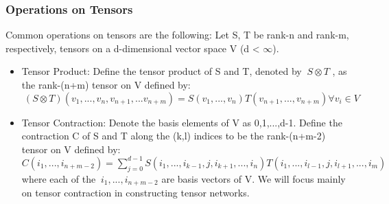 \documentclass[11pt]{beamer}
\newcommand{\vs}{\vskip10pt}
\begin{document}
\begin{frame} 
	
	\frametitle{Operations on Tensors}
	
	Common operations on tensors are the following: 
	\vs 
		Let S, T be rank-n and rank-m, respectively, tensors on a d-dimensional vector space V (d < $\infty$).
		
	\begin{itemize}
		
		\item Tensor Product: Define the tensor product of S and T, denoted by $\ S \otimes T $ , as the rank-(n+m) tensor on V defined by: \fontsize{8}{1}
		\vs
		$\ (S \otimes T) (v_1,...,v_n,v_{n+1},...v_{n+m}) = S(v_1,...,v_n)T(v_{n+1},...,v_{n+m}) \forall v_i \in V $
		\fontsize{12}{1}
		\vs
		\item Tensor Contraction: Denote the basis elements of V as 0,1,...,d-1. Define the contraction C of S and T along the (k,l) indices to be the rank-(n+m-2) tensor on V defined by: \fontsize{8}{1}
		\vs
		$ C(i_1,...,i_{n+m-2}) = \sum_{j=0}^{d-1} S(i_1,...,i_{k-1},j,i_{k+1},...,i_n)T(i_1,...,i_{l-1},j,i_{l+1},...,i_m) $ where each of the $\ i_1,...,i_{n+m-2} $ are basis vectors of V. 
		\vs 
		We will focus mainly on tensor contraction in constructing tensor networks.
		
	\end{itemize}
	
	\end{frame}
\end{document}
